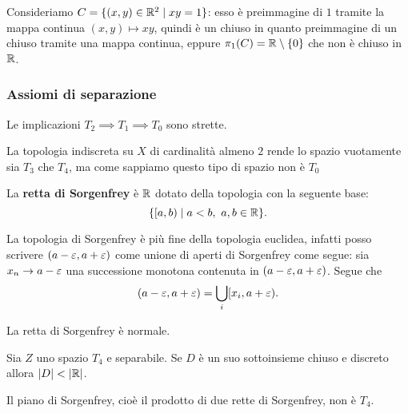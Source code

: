 \begin{multicols*}{2}
\begin{example}\label{ProiezioniNonSempreChiuse}
Consideriamo $C=\{(x,y)\in\mathbb{R}^2\mid xy=1\}$: esso \`e preimmagine di $1$ tramite la mappa continua $(x,y)\mapsto xy$, quindi \`e un chiuso in quanto preimmagine di un chiuso tramite una mappa continua, eppure $\pi_1(C)=\mathbb{R}\setminus\{0\}$ che non \`e chiuso in $\mathbb{R}$.
\end{example}

\subsubsection{Assiomi di separazione}
\begin{proposition}\label{T1NonT2-T0NonT1}
Le implicazioni $T_2\implies T_1\implies T_0$ sono strette.
\end{proposition}

\begin{example}\label{SpazioT4NonT0}
La topologia indiscreta su $X$ di cardinalit\`a almeno $2$ rende lo spazio vuotamente sia $T_3$ che $T_4$, ma come sappiamo questo tipo di spazio non \`e $T_0$
\end{example}

\begin{definition}
La \textbf{retta di Sorgenfrey} \`e $\mathbb{R}$ dotato della topologia con la seguente base:
\[\{[a,b)\mid a<b,\ a,b\in\R\}.\]
\end{definition}
\begin{remark}
La topologia di Sorgenfrey \`e pi\`u fine della topologia euclidea, infatti posso scrivere $(a-\varepsilon,a+\varepsilon)$ come unione di aperti di Sorgenfrey come segue: sia $x_n\to a-\varepsilon$ una successione monotona contenuta in $(a-\varepsilon,a+\varepsilon)$. Segue che
\[(a-\varepsilon,a+\varepsilon)=\bigcup_{i}[x_i,a+\varepsilon).\]
\end{remark}

\begin{example}\label{RettaDiSorgenfreyENormale}
La retta di Sorgenfrey \`e normale.
\end{example}

\begin{lemma}\label{T4SeparabileAlloraSottoinsiemeDiscretoChiusoHaCardinalitaMinoreDelContinuo}
Sia $Z$ uno spazio $T_4$ e separabile. Se $D$ \`e un suo sottoinsieme chiuso e discreto allora $|D|<|\R|$.
\end{lemma}

\begin{example}\label{PianoDiSorgenfrey}
Il piano di Sorgenfrey, cio\`e il prodotto di due rette di Sorgenfrey, non \`e $T_4$.
\end{example}


\end{multicols*}
